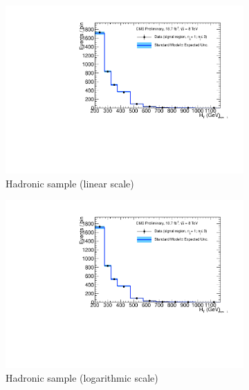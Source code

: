 \clearpage
\begin{figure}[h!]
  \centering
  \begin{subfigure}[b]{0.48\textwidth}
    \includegraphics[width=\textwidth,page=1]
    {Figs/results/v0/blueBand/bestFit_2012dev_RQcdZero_fZinvAll_1b_le3j-12hp_smOnly}
    \caption{Hadronic sample (linear scale)}
  \end{subfigure}
  \begin{subfigure}[b]{0.48\textwidth}
    \includegraphics[width=\textwidth,page=2]
    {Figs/results/v0/blueBand/bestFit_2012dev_RQcdZero_fZinvAll_1b_le3j-12hp_smOnly}
    \caption{Hadronic sample (logarithmic scale)}
  \end{subfigure}
  \begin{subfigure}[b]{0.48\textwidth}

\end{subfigure}
\end{figure}
